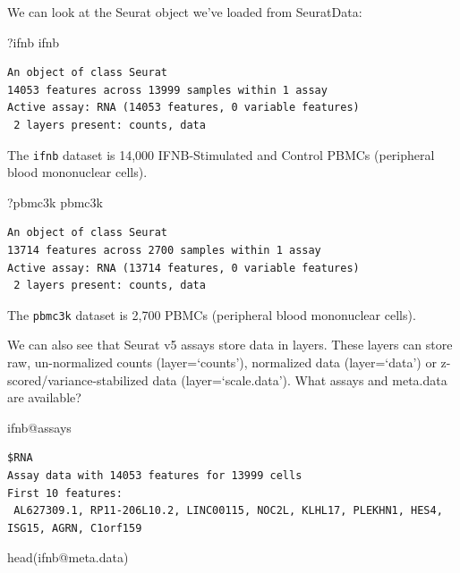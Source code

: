 \documentclass[
  letterpaper,
  DIV=11,
  numbers=noendperiod]{scrreprt}
\newenvironment{Shaded}{\begin{snugshade}}{\end{snugshade}}
\newcommand{\FunctionTok}[1]{\textcolor[rgb]{0.28,0.35,0.67}{#1}}
\newcommand{\NormalTok}[1]{\textcolor[rgb]{0.00,0.23,0.31}{#1}}
\newcommand{\SpecialCharTok}[1]{\textcolor[rgb]{0.37,0.37,0.37}{#1}}
\begin{document}
We can look at the Seurat object we've loaded from SeuratData:

\begin{Shaded}
\begin{Highlighting}[]
\NormalTok{?ifnb}
\NormalTok{ifnb}
\end{Highlighting}
\end{Shaded}

\begin{verbatim}
An object of class Seurat 
14053 features across 13999 samples within 1 assay 
Active assay: RNA (14053 features, 0 variable features)
 2 layers present: counts, data
\end{verbatim}

The \texttt{ifnb} dataset is 14,000 IFNB-Stimulated and Control PBMCs
(peripheral blood mononuclear cells).

\begin{Shaded}
\begin{Highlighting}[]
\NormalTok{?pbmc3k}
\NormalTok{pbmc3k}
\end{Highlighting}
\end{Shaded}

\begin{verbatim}
An object of class Seurat 
13714 features across 2700 samples within 1 assay 
Active assay: RNA (13714 features, 0 variable features)
 2 layers present: counts, data
\end{verbatim}

The \texttt{pbmc3k} dataset is 2,700 PBMCs (peripheral blood mononuclear
cells).

We can also see that Seurat v5 assays store data in layers. These layers
can store raw, un-normalized counts (layer=`counts'), normalized data
(layer=`data') or z-scored/variance-stabilized data
(layer=`scale.data'). What assays and meta.data are available?

\begin{Shaded}
\begin{Highlighting}[]
\NormalTok{ifnb}\SpecialCharTok{@}\NormalTok{assays}
\end{Highlighting}
\end{Shaded}

\begin{verbatim}
$RNA
Assay data with 14053 features for 13999 cells
First 10 features:
 AL627309.1, RP11-206L10.2, LINC00115, NOC2L, KLHL17, PLEKHN1, HES4,
ISG15, AGRN, C1orf159 
\end{verbatim}

\begin{Shaded}
\begin{Highlighting}[]
\FunctionTok{head}\NormalTok{(ifnb}\SpecialCharTok{@}\NormalTok{meta.data)}
\end{Highlighting}
\end{Shaded}
\end{document}
